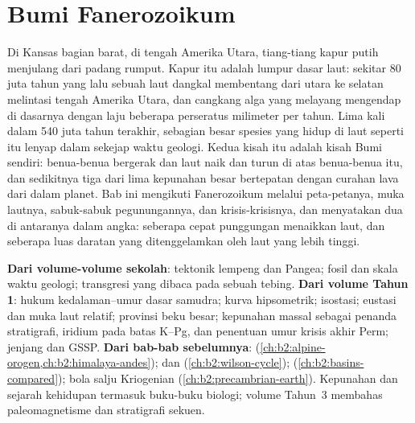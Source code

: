 \chapter{Bumi Fanerozoikum}\label{ch:b2:phanerozoic-earth}

Di Kansas bagian barat, di tengah Amerika Utara, tiang-tiang kapur putih menjulang dari
padang rumput. Kapur itu adalah lumpur dasar laut: sekitar 80 juta tahun yang lalu sebuah laut
dangkal membentang dari utara ke selatan melintasi tengah Amerika Utara, dan cangkang
alga yang melayang mengendap di dasarnya dengan laju beberapa perseratus milimeter per tahun. Lima kali dalam
540 juta tahun terakhir, sebagian besar spesies yang hidup di laut seperti itu lenyap dalam
sekejap waktu geologi. Kedua kisah itu adalah kisah Bumi sendiri: benua-benua bergerak dan laut naik dan turun di atas
benua-benua itu, dan sedikitnya tiga dari lima kepunahan besar bertepatan dengan curahan lava dari dalam
planet. Bab ini mengikuti Fanerozoikum melalui peta-petanya, muka lautnya, sabuk-sabuk
pegunungannya, dan krisis-krisisnya, dan menyatakan dua di antaranya dalam angka: seberapa cepat punggungan menaikkan laut, dan seberapa luas
daratan yang ditenggelamkan oleh laut yang lebih tinggi.

\begin{recall}
\textbf{Dari volume-volume sekolah}: tektonik lempeng dan Pangea; fosil dan skala waktu
geologi; transgresi yang dibaca pada sebuah tebing. \textbf{Dari volume Tahun 1}: hukum kedalaman--umur
dasar samudra; kurva hipsometrik; isostasi; eustasi dan muka laut relatif; provinsi beku
besar; kepunahan massal sebagai penanda stratigrafi, iridium pada batas K--Pg, dan
penentuan umur krisis akhir Perm; jenjang dan GSSP. \textbf{Dari bab-bab sebelumnya}: 
(\cref{ch:b2:alpine-orogen,ch:b2:himalaya-andes});  dan 
(\cref{ch:b2:wilson-cycle});  (\cref{ch:b2:basins-compared}); bola salju
Kriogenian (\cref{ch:b2:precambrian-earth}). Kepunahan dan sejarah kehidupan termasuk buku-buku
biologi; volume Tahun~3 membahas paleomagnetisme dan stratigrafi sekuen.
\end{recall}

